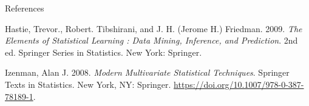 \documentclass[
  ignorenonframetext,
  aspectratio=169,
]{beamer}
\newlength{\cslhangindent}
\newlength{\cslentryspacingunit} %
\newenvironment{CSLReferences}[2] %
 {%
  \setlength{\parindent}{0pt}
  \ifodd #1
  \let\oldpar\par
  \def\par{\hangindent=\cslhangindent\oldpar}
  \fi
  \setlength{\parskip}{#2\cslentryspacingunit}
 }%
 {}
\begin{document}
\begin{frame}{References}
\protect\hypertarget{references}{}
\hypertarget{refs}{}
\begin{CSLReferences}{1}{0}
\leavevmode{}%
Hastie, Trevor., Robert. Tibshirani, and J. H. (Jerome H.) Friedman.
2009. \emph{The Elements of Statistical Learning : Data Mining,
Inference, and Prediction}. 2nd ed. Springer Series in Statistics. {New
York}: {Springer}.

\leavevmode{}%
Izenman, Alan J. 2008. \emph{Modern {Multivariate Statistical
Techniques}}. Springer {Texts} in {Statistics}. {New York, NY}:
{Springer}. \url{https://doi.org/10.1007/978-0-387-78189-1}.

\end{CSLReferences}
\end{frame}
\end{document}
